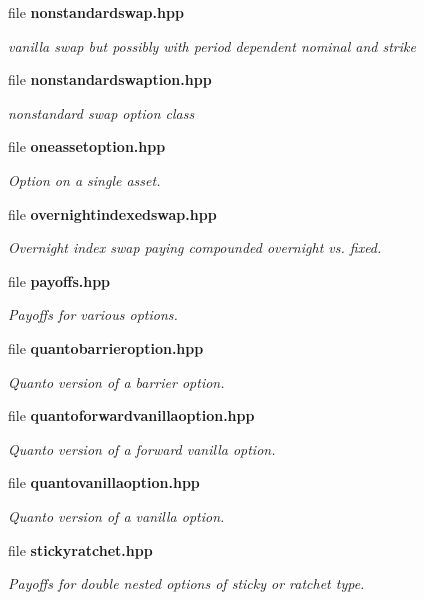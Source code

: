\begin{DoxyCompactItemize}
file {\bf nonstandardswap.\+hpp}
\begin{DoxyCompactList}\small\item\em vanilla swap but possibly with period dependent nominal and strike \end{DoxyCompactList}\item 
file {\bf nonstandardswaption.\+hpp}
\begin{DoxyCompactList}\small\item\em nonstandard swap option class \end{DoxyCompactList}\item 
file {\bf oneassetoption.\+hpp}
\begin{DoxyCompactList}\small\item\em Option on a single asset. \end{DoxyCompactList}\item 
file {\bf overnightindexedswap.\+hpp}
\begin{DoxyCompactList}\small\item\em Overnight index swap paying compounded overnight vs. fixed. \end{DoxyCompactList}\item 
file {\bf payoffs.\+hpp}
\begin{DoxyCompactList}\small\item\em Payoffs for various options. \end{DoxyCompactList}\item 
file {\bf quantobarrieroption.\+hpp}
\begin{DoxyCompactList}\small\item\em Quanto version of a barrier option. \end{DoxyCompactList}\item 
file {\bf quantoforwardvanillaoption.\+hpp}
\begin{DoxyCompactList}\small\item\em Quanto version of a forward vanilla option. \end{DoxyCompactList}\item 
file {\bf quantovanillaoption.\+hpp}
\begin{DoxyCompactList}\small\item\em Quanto version of a vanilla option. \end{DoxyCompactList}\item 
file {\bf stickyratchet.\+hpp}
\begin{DoxyCompactList}\small\item\em Payoffs for double nested options of sticky or ratchet type. \end{DoxyCompactList}\item 

\end{DoxyCompactItemize}
